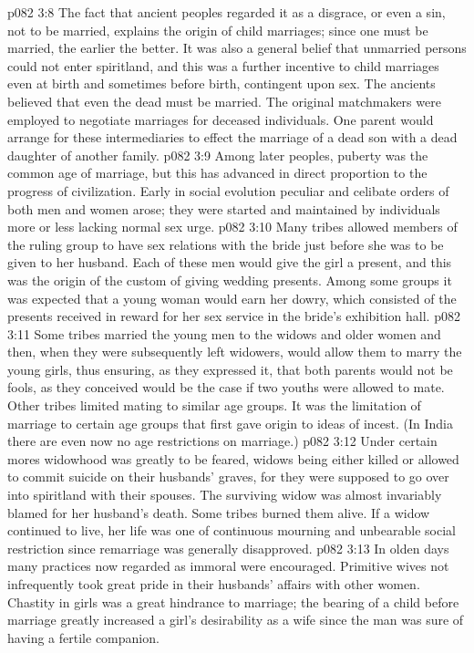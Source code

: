 \vs p082 3:8 \pc The fact that ancient peoples regarded it as a disgrace, or even a sin, not to be married, explains the origin of child marriages; since one must be married, the earlier the better. It was also a general belief that unmarried persons could not enter spiritland, and this was a further incentive to child marriages even at birth and sometimes before birth, contingent upon sex. The ancients believed that even the dead must be married. The original matchmakers were employed to negotiate marriages for deceased individuals. One parent would arrange for these intermediaries to effect the marriage of a dead son with a dead daughter of another family.
\vs p082 3:9 Among later peoples, puberty was the common age of marriage, but this has advanced in direct proportion to the progress of civilization. Early in social evolution peculiar and celibate orders of both men and women arose; they were started and maintained by individuals more or less lacking normal sex urge.
\vs p082 3:10 Many tribes allowed members of the ruling group to have sex relations with the bride just before she was to be given to her husband. Each of these men would give the girl a present, and this was the origin of the custom of giving wedding presents. Among some groups it was expected that a young woman would earn her dowry, which consisted of the presents received in reward for her sex service in the bride’s exhibition hall.
\vs p082 3:11 Some tribes married the young men to the widows and older women and then, when they were subsequently left widowers, would allow them to marry the young girls, thus ensuring, as they expressed it, that both parents would not be fools, as they conceived would be the case if two youths were allowed to mate. Other tribes limited mating to similar age groups. It was the limitation of marriage to certain age groups that first gave origin to ideas of incest. (In India there are even now no age restrictions on marriage.)
\vs p082 3:12 \pc Under certain mores widowhood was great\-ly to be feared, widows being either killed or allowed to commit suicide on their husbands’ graves, for they were supposed to go over into spiritland with their spouses. The surviving widow was almost invariably blamed for her husband’s death. Some tribes burned them alive. If a widow continued to live, her life was one of continuous mourning and unbearable social restriction since remarriage was generally disapproved.
\vs p082 3:13 In olden days many practices now regarded as immoral were encouraged. Primitive wives not infrequently took great pride in their husbands’ affairs with other women. Chastity in girls was a great hindrance to marriage; the bearing of a child before marriage greatly increased a girl’s desirability as a wife since the man was sure of having a fertile companion.
